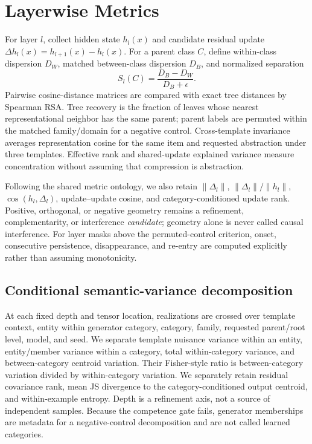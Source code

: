 \documentclass[11pt]{article}
\begin{document}
\section{Layerwise Metrics}
For layer $l$, collect hidden state $h_l(x)$ and candidate residual update $\Delta h_l(x)=h_{l+1}(x)-h_l(x)$. For a parent class $C$, define within-class dispersion $D_W$, matched between-class dispersion $D_B$, and normalized separation
\begin{equation}
S_l(C)=\frac{D_B-D_W}{D_B+\epsilon}.
\end{equation}
Pairwise cosine-distance matrices are compared with exact tree distances by Spearman RSA. Tree recovery is the fraction of leaves whose nearest representational neighbor has the same parent; parent labels are permuted within the matched family/domain for a negative control. Cross-template invariance averages representation cosine for the same item and requested abstraction under three templates. Effective rank and shared-update explained variance measure concentration without assuming that compression is abstraction.

Following the shared metric ontology, we also retain $\|\Delta_l\|$, $\|\Delta_l\|/\|h_l\|$, $\cos(h_l,\Delta_l)$, update--update cosine, and category-conditioned update rank. Positive, orthogonal, or negative geometry remains a refinement, complementarity, or interference \emph{candidate}; geometry alone is never called causal interference. For layer masks above the permuted-control criterion, onset, consecutive persistence, disappearance, and re-entry are computed explicitly rather than assuming monotonicity.

\subsection{Conditional semantic-variance decomposition}
At each fixed depth and tensor location, realizations are crossed over template context, entity within generator category, category, family, requested parent/root level, model, and seed. We separate template nuisance variance within an entity, entity/member variance within a category, total within-category variance, and between-category centroid variation. Their Fisher-style ratio is between-category variation divided by within-category variation. We separately retain residual covariance rank, mean JS divergence to the category-conditioned output centroid, and within-example entropy. Depth is a refinement axis, not a source of independent samples. Because the competence gate fails, generator memberships are metadata for a negative-control decomposition and are not called learned categories.
\end{document}
